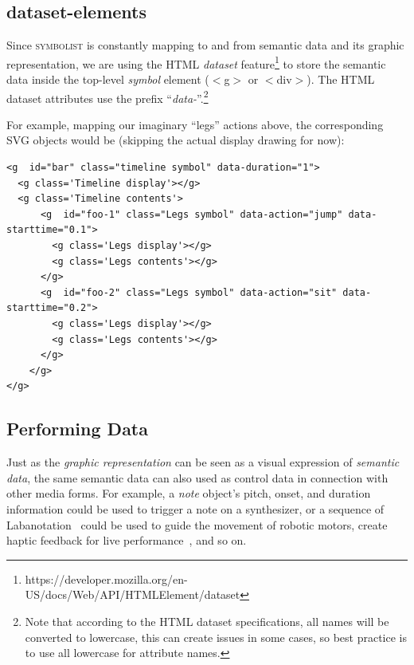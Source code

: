 \documentclass{article}
\def\symbolist{\textsc{symbolist}\xspace}
\def\oscfontsize{\footnotesize}
\begin{document}
\subsection{dataset-elements}

Since \symbolist is constantly mapping to and from semantic data and its graphic representation, we are using the HTML \textit{dataset} feature\footnote{https://developer.mozilla.org/en-US/docs/Web/API/HTMLElement/dataset} to store the semantic data inside the top-level \textit{symbol} element ($<$g$>$ or $<$div$>$).
The HTML dataset attributes use the prefix ``\textit{data-}''.\footnote{Note that according to the HTML dataset specifications, all names will be converted to lowercase, this can create issues in some cases, so best practice is to use all lowercase for attribute names.}

For example, mapping our imaginary ``legs'' actions above, the corresponding SVG objects would be (skipping the actual display drawing for now):

\begin{minipage}{\linewidth}
\begin{lstlisting}[mathescape, columns=fullflexible, breaklines=true,basicstyle=\oscfontsize\fontfamily{lmvtt}\selectfont]
<g  id="bar" class="timeline symbol" data-duration="1">
  <g class='Timeline display'></g>
  <g class='Timeline contents'>
      <g  id="foo-1" class="Legs symbol" data-action="jump" data-starttime="0.1">
        <g class='Legs display'></g>
        <g class='Legs contents'></g>
      </g>
      <g  id="foo-2" class="Legs symbol" data-action="sit" data-starttime="0.2">
        <g class='Legs display'></g>
        <g class='Legs contents'></g>
      </g>
    </g>
</g>
\end{lstlisting}
\end{minipage}




\subsection{Performing Data}

Just as the \textit{graphic representation} can be seen as a visual expression of \textit{semantic data}, the same semantic data can also used as control data in connection with other media forms. For example, a \textit{note} object's pitch, onset, and duration information could be used to trigger a note on a synthesizer, or a sequence of Labanotation~\cite{guest2014labanotation} could be used to guide the movement of robotic motors, create haptic feedback for live performance~\cite{west2019design}, and so on. 
\end{document}
